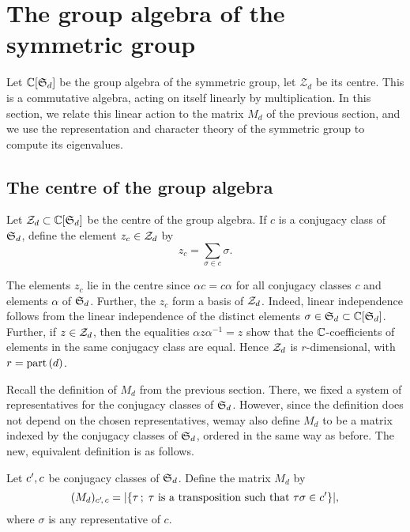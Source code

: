 \section{The group algebra of the symmetric group}

Let $\mathbb{C}[\operatorname{\mathfrak{S}}_d]$ be the group algebra of the symmetric group, let $\mathcal{Z}_d$ be its centre. This is a commutative algebra, acting on itself linearly by multiplication. In this section, we relate this linear action to the matrix $M_d$ of the previous section, and we use the representation and character theory of the symmetric group to compute its eigenvalues.

\subsection{The centre of the group algebra}

\begin{defi}
 Let $\mathcal{Z}_d\subset\mathbb{C}[\operatorname{\mathfrak{S}}_d]$ be the centre of the group algebra. If $c$ is a conjugacy class of $\operatorname{\mathfrak{S}}_d$, define the element $z_c\in\mathcal{Z}_d$ by
 \[
  z_c=\sum_{\sigma\in c}\sigma.
 \]
\end{defi}

\begin{rmk}
 The elements $z_c$ lie in the centre since $\alpha c=c\alpha$ for all conjugacy classes $c$ and elements $\alpha$ of $\operatorname{\mathfrak{S}}_d$. Further, the $z_c$ form a basis of $\mathcal{Z}_d$. Indeed, linear independence follows from the linear independence of the distinct elements $\sigma\in\operatorname{\mathfrak{S}}_d\subset\mathbb{C}[\operatorname{\mathfrak{S}}_d]$. Further, if $z\in\mathcal{Z}_d$, then the equalities $\alpha z\alpha^{-1}=z$ show that the $\mathbb{C}$-coefficients of elements in the same conjugacy class are equal. Hence $\mathcal{Z}_d$ is $r$-dimensional, with $r=\operatorname{part}{(d)}$.
\end{rmk}

Recall the definition of $M_d$ from the previous section. There, we fixed a system of representatives for the conjugacy classes of $\operatorname{\mathfrak{S}}_d$. However, since the definition does  not depend on the chosen representatives, wemay also define $M_d$ to be a matrix indexed by the conjugacy classes of $\operatorname{\mathfrak{S}}_d$, ordered in the same way as before. The new, equivalent definition is as follows.

\begin{defi} Let $c',c$ be conjugacy classes of $\operatorname{\mathfrak{S}}_d$. Define the matrix $M_d$ by
\[(M_d)_{c'\!,\, c} = |\{\tau\,;\; \tau\text{ is a transposition such that }\tau\sigma\in c'\}|,\] where $\sigma$ is any representative of $c$.
\end{defi}

